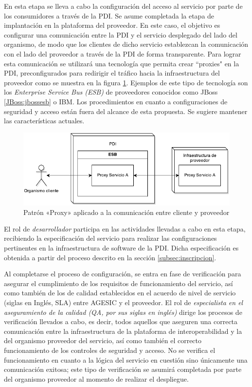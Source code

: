 \documentclass[11pt]{article}
\begin{document}
				En esta etapa se lleva a cabo la configuración del acceso al servicio por parte de los consumidores a través de la PDI. Se asume completada la etapa de implantación en la plataforma del proveedor. En este caso, el objetivo es configurar una comunicación entre la PDI y el servicio desplegado del lado del organismo, de modo que los clientes de dicho servicio establezcan la comunicación con el lado del proveedor a través de la PDI de forma transparente. Para lograr esta comunicación se utilizará una tecnología que permita crear ``proxies" en la PDI, preconfigurados para redirigir el tráfico hacia la infraestructura del proveedor como se muestra en la figura \ref{imagen:cliente_pdi_proveedor}. Ejemplos de este tipo de tecnología son los \emph{Enterprise Service Bus (ESB)} de proveedores conocidos como JBoss \ref{JBoss:jbossesb} o IBM. Los procedimientos en cuanto a configuraciones de seguridad y acceso están fuera del alcance de esta propuesta. Se sugiere mantener las características actuales.

				\begin{figure}[h]
					\centering
					\includegraphics[width=\linewidth]{cliente_pdi_proveedor}
					\caption{Patrón «Proxy» aplicado a la comunicación entre cliente y proveedor}
					\label{imagen:cliente_pdi_proveedor}
				\end{figure}

				El rol de \emph{desarrollador} participa en las actividades llevadas a cabo en esta etapa, recibiendo la especificación del servicio para realizar las configuraciones pertinentes en la infraestructura de software de la PDI. Dicha especificación es obtenida a partir del proceso descrito en la sección \ref{subsec:inscripcion}.

				Al completarse el proceso de configuración, se entra en fase de verificación para asegurar el cumplimiento de los requisitos de funcionamiento del servicio, así como también de los de calidad establecidos en el acuerdo de nivel de servicio (siglas en Inglés, SLA) entre AGESIC y el proveedor. El rol de \emph{especialista en el aseguramiento de la calidad (QA, por sus siglas en inglés)} dirige los procesos de verificación llevados a cabo, es decir, todos aquellos que aseguren una correcta comunicación entre la infraestructura de la plataforma de interoperabilidad y la del organismo proveedor del servicio, así como también el correcto funcionamiento de los controles de seguridad y acceso. No se verifica el funcionamiento en cuanto a la lógica del servicio en cuestión sino únicamente una comunicación exitosa; este tipo de verificación se asumirá completada por parte del organismo proveedor al momento de realizar el despliegue.
\end{document}

